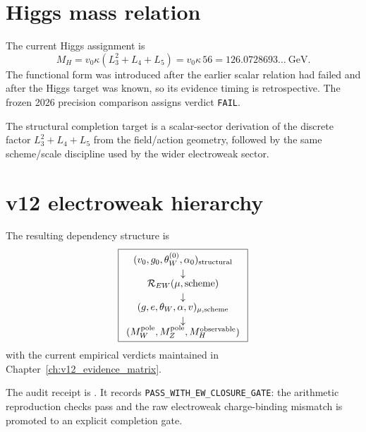 \section{Higgs mass relation}

The current Higgs assignment is
\begin{equation}
\boxed{
M_H=v_0\kappa(L_3^2+L_4+L_5)
=v_0\kappa\,56
=126.0728693\ldots\ \mathrm{GeV}.
}
\label{eq:v12_higgs_mass}
\end{equation}
The functional form was introduced after the earlier scalar relation had failed and after the Higgs target was known, so its evidence timing is retrospective. The frozen 2026 precision comparison assigns verdict \texttt{FAIL}.

The structural completion target is a scalar-sector derivation of the discrete factor $L_3^2+L_4+L_5$ from the field/action geometry, followed by the same scheme/scale discipline used by the wider electroweak sector.

\section{v12 electroweak hierarchy}

The resulting dependency structure is
\[
\boxed{
\begin{array}{c}
(v_0,g_0,\theta_W^{(0)},\alpha_0)_{\rm structural}\\[2pt]
\downarrow\\[-2pt]
\mathcal R_{EW}(\mu,\mathrm{scheme})\\[2pt]
\downarrow\\[-2pt]
(g,e,\theta_W,\alpha,v)_{\mu,\mathrm{scheme}}\\[2pt]
\downarrow\\[-2pt]
(M_W^{\rm pole},M_Z^{\rm pole},M_H^{\rm observable})
\end{array}}
\]
with the current empirical verdicts maintained in Chapter~\ref{ch:v12_evidence_matrix}.

The audit receipt is
. It records \texttt{PASS\_WITH\_EW\_CLOSURE\_GATE}: the arithmetic reproduction checks pass and the raw electroweak charge-binding mismatch is promoted to an explicit completion gate.
